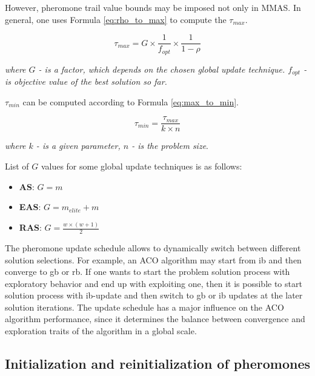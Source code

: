 \documentclass[11pt,a4paper,oneside]{book}
\begin{document}
However, pheromone trail value bounds may be imposed not only in MMAS. In general, one uses Formula \eqref{eq:rho_to_max} to compute the $\tau_{max}$.

\begin{equation}
\tau_{max} = G \times \frac{1}{f_{opt}} \times \frac{1}{1-\rho}
\label{eq:rho_to_max}
\end{equation}

\textit{where $G$ - is a factor, which depends on the chosen global update technique. $f_{opt}$ - is objective value of the best solution so far.}

$\tau_{min}$ can be computed according to Formula \eqref{eq:max_to_min}.

\begin{equation}
\tau_{min} = \frac{\tau_{max}} {k \times n} 
\label{eq:max_to_min}
\end{equation}

\textit{where $k$ - is a given parameter, $n$ -  is the problem size}.

List of $G$ values for some global update techniques is as follows:

\begin{itemize}
\item \textbf{AS}: $G = m$
\item \textbf{EAS}: $G = m_{elite} + m$
\item \textbf{RAS}: $G = \frac{w \times (w + 1)}{2}$
\end{itemize}

The pheromone update schedule allows to dynamically switch between different solution selections. For example, an ACO algorithm may start from ib and then converge to gb or rb. If one wants to start the problem solution process with exploratory behavior and end up with exploiting one, then it is possible to start solution process with ib-update and then switch to gb or ib updates at the later solution iterations. The update schedule has a major influence on the ACO algorithm performance, since it determines the balance between convergence and exploration traits of the algorithm in a global scale.



\subsection{Initialization and reinitialization of pheromones}
\end{document}
